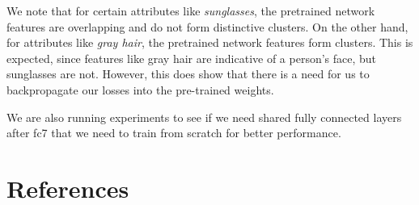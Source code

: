 \documentclass[twocolumn]{article}
\begin{document}
We note that for certain attributes like \emph{sunglasses}, the pretrained network features are overlapping and do not form distinctive clusters. On the other hand, for attributes like \emph{gray hair}, the pretrained network features form clusters. This is expected, since features like gray hair are indicative of a person's face, but sunglasses are not. However, this does show that there is a need for us to backpropagate our losses into the pre-trained weights.

We are also running experiments to see if we need shared fully connected layers after fc7 that we need to train from scratch for better performance.
\section{References}
\printbibliography[heading=none]
\end{document}
